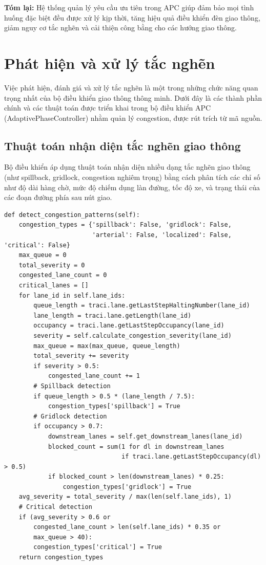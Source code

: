\vspace{0.5cm}

\noindent\textbf{Tóm lại:} Hệ thống quản lý yêu cầu ưu tiên trong APC giúp đảm bảo mọi tình huống đặc biệt đều được xử lý kịp thời, tăng hiệu quả điều khiển đèn giao thông, giảm nguy cơ tắc nghẽn và cải thiện công bằng cho các hướng giao thông.

\section{Phát hiện và xử lý tắc nghẽn}

Việc phát hiện, đánh giá và xử lý tắc nghẽn là một trong những chức năng quan trọng nhất của bộ điều khiển giao thông thông minh. Dưới đây là các thành phần chính và các thuật toán được triển khai trong bộ điều khiển APC (AdaptivePhaseController) nhằm quản lý congestion, được rút trích từ mã nguồn.

\subsection{Thuật toán nhận diện tắc nghẽn giao thông}

Bộ điều khiển áp dụng thuật toán nhận diện nhiều dạng tắc nghẽn giao thông (như spillback, gridlock, congestion nghiêm trọng) bằng cách phân tích các chỉ số như độ dài hàng chờ, mức độ chiếm dụng làn đường, tốc độ xe, và trạng thái của các đoạn đường phía sau nút giao.
\begin{lstlisting}[style=py,caption={Hàm detect\_congestion\_patterns trong APC}]
def detect_congestion_patterns(self):
    congestion_types = {'spillback': False, 'gridlock': False,
                        'arterial': False, 'localized': False, 'critical': False}
    max_queue = 0
    total_severity = 0
    congested_lane_count = 0
    critical_lanes = []
    for lane_id in self.lane_ids:
        queue_length = traci.lane.getLastStepHaltingNumber(lane_id)
        lane_length = traci.lane.getLength(lane_id)
        occupancy = traci.lane.getLastStepOccupancy(lane_id)
        severity = self.calculate_congestion_severity(lane_id)
        max_queue = max(max_queue, queue_length)
        total_severity += severity
        if severity > 0.5:
            congested_lane_count += 1
        # Spillback detection
        if queue_length > 0.5 * (lane_length / 7.5):
            congestion_types['spillback'] = True
        # Gridlock detection
        if occupancy > 0.7:
            downstream_lanes = self.get_downstream_lanes(lane_id)
            blocked_count = sum(1 for dl in downstream_lanes
                                if traci.lane.getLastStepOccupancy(dl) > 0.5)
            if blocked_count > len(downstream_lanes) * 0.25:
                congestion_types['gridlock'] = True
    avg_severity = total_severity / max(len(self.lane_ids), 1)
    # Critical detection
    if (avg_severity > 0.6 or 
        congested_lane_count > len(self.lane_ids) * 0.35 or
        max_queue > 40):
        congestion_types['critical'] = True
    return congestion_types
\end{lstlisting}

